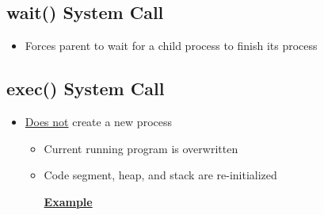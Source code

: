 \documentclass[12pt]{article}
\begin{document}
\subsection{wait() System Call}
\begin{itemize}
    \item Forces parent to wait for a child process to finish its process
\end{itemize}

\subsection{exec() System Call}
\begin{itemize}
    \item \underline{Does not} create a new process
    \begin{itemize}
        \item Current running program is overwritten
        \item Code segment, heap, and stack are re-initialized

        \bigskip

        \underline{\textbf{Example}}

        \bigskip

        \texttt{}
    \end{itemize}
\end{itemize}
\end{document}
